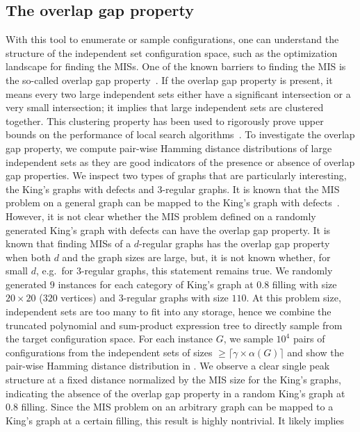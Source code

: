 \documentclass[review, onefignum, onetabnum]{siamart190516}
\begin{document}
\subsection{The overlap gap property\label{sec:overlap-gap}}
With this tool to enumerate or sample configurations, one can understand the structure of the independent set configuration space, such as the optimization landscape for finding the MISs.
One of the known barriers to finding the MIS is the so-called overlap gap property~\cite{Gamarnik2013, Gamarnik2019}.
If the overlap gap property is present, it means every two large independent sets either have a significant intersection or a very small intersection;
it implies that large independent sets are clustered together.
This clustering property has been used to rigorously prove upper bounds on the performance of local search algorithms~\cite{Gamarnik2013, Gamarnik2019}.
To investigate the overlap gap property, we compute pair-wise Hamming distance distributions of large independent sets as they are good indicators of the presence or absence of overlap gap properties.
We inspect two types of graphs that are particularly interesting, the King's graphs with defects and $3$-regular graphs.
It is known that the MIS problem on a general graph can be mapped to the King's graph with defects~\cite{Garey1977,Ebadi2022}. However, it is not clear whether the MIS problem defined on a randomly generated King's graph with defects can have the overlap gap property.
It is known that finding MISs of a $d$-regular graphs has the overlap gap property~\cite{Rahman2017,Gamarnik2021} when both $d$ and the graph sizes are large, but, it is not known whether, for small $d$, e.g.\ for $3$-regular graphs, this statement remains true.
We randomly generated $9$ instances for each category of King's graph at $0.8$ filling with size $20\times 20$ ($320$ vertices) and $3$-regular graphs with size $110$.
At this problem size, independent sets are too many to fit into any storage, hence we combine the truncated polynomial and sum-product expression tree to directly sample from the target configuration space.
For each instance $G$, we sample $10^4$ pairs of configurations from the independent sets of sizes $\geq \lceil \gamma \times \alpha(G)\rceil$ and show the pair-wise Hamming distance distribution in .
We observe a clear single peak structure at a fixed distance normalized by the MIS size for the King's graphs, indicating the absence of the overlap gap property in a random King's graph at $0.8$ filling.
Since the MIS problem on an arbitrary graph can be mapped to a King's graph at a certain filling, this result is highly nontrivial. It likely implies 
\end{document}
